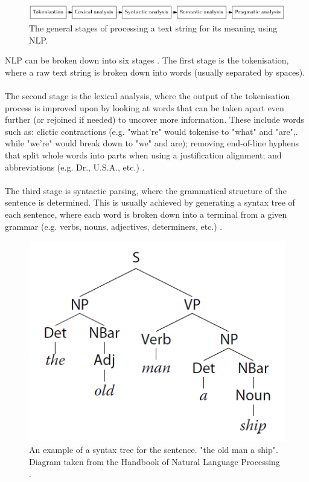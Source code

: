 \documentclass[12pt]{article}
\begin{document}
\begin{center}
\begin{figure}[H]
  \includegraphics[width=\textwidth]{nlp-stages.png}
  \caption{The general stages of processing a text string for its meaning using NLP.}
\end{figure}
\end{center}

NLP can be broken down into six stages \cite{RefWorks:38}. The first stage is the tokenisation, where a raw text string is broken down into words (usually separated by spaces).
\\
\\
The second stage is the lexical analysis, where the output of the tokenisation process is improved upon by looking at words that can be taken apart even further (or rejoined if needed) to uncover more information. These include words such as: clictic contractions (e.g. "what're" would tokenise to "what" and "are",. while "we're" would break down to "we" and are); removing end-of-line hyphens that split whole words into parts when using a justification alignment; and abbreviations (e.g. Dr., U.S.A., etc.) \cite{RefWorks:39}.
\\
\\
The third stage is syntactic parsing, where the grammatical structure of the sentence is determined. This is usually achieved by generating a syntax tree of each sentence, where each word is broken down into a terminal from a given grammar (e.g. verbs, nouns, adjectives, determiners, etc.) \cite{RefWorks:40}.

\begin{center}
\begin{figure}[H]
\begin{center}
  \includegraphics[scale=1]{syntax-tree.png}
  \caption{An example of a syntax tree for the sentence. "the old man a ship". Diagram taken from the Handbook of Natural Language Processing  \cite{RefWorks:40}.}
  \end{center}
\end{figure}
\end{center}
\end{document}
